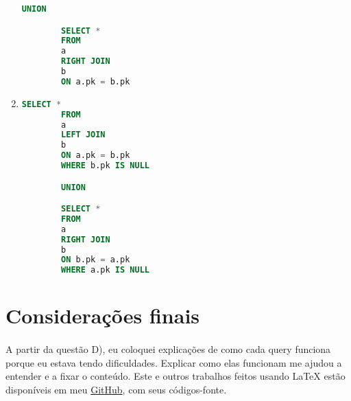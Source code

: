 \documentclass{article}
\begin{document}
\begin{enumerate}[label=\alph*)]
\begin{lstlisting}[language=SQL]
        UNION

        SELECT *
        FROM
        a
        RIGHT JOIN
        b
        ON a.pk = b.pk
    \end{lstlisting}

    \item 
    \begin{lstlisting}[language=SQL]
        SELECT *
        FROM
        a
        LEFT JOIN
        b
        ON a.pk = b.pk
        WHERE b.pk IS NULL

        UNION

        SELECT *
        FROM
        a
        RIGHT JOIN
        b
        ON b.pk = a.pk
        WHERE a.pk IS NULL
    \end{lstlisting}

\end{enumerate}

\section*{Considerações finais}
\paragraph{}A partir da questão D), eu coloquei explicações de como cada query funciona porque eu estava tendo dificuldades. Explicar como elas funcionam me ajudou a entender e a fixar o conteúdo. Este e outros trabalhos feitos usando \LaTeX{} estão disponíveis em meu \href{https://github.com/gpgp2006/LaTeX}{GitHub}, com seus códigos-fonte. 
\end{document}
